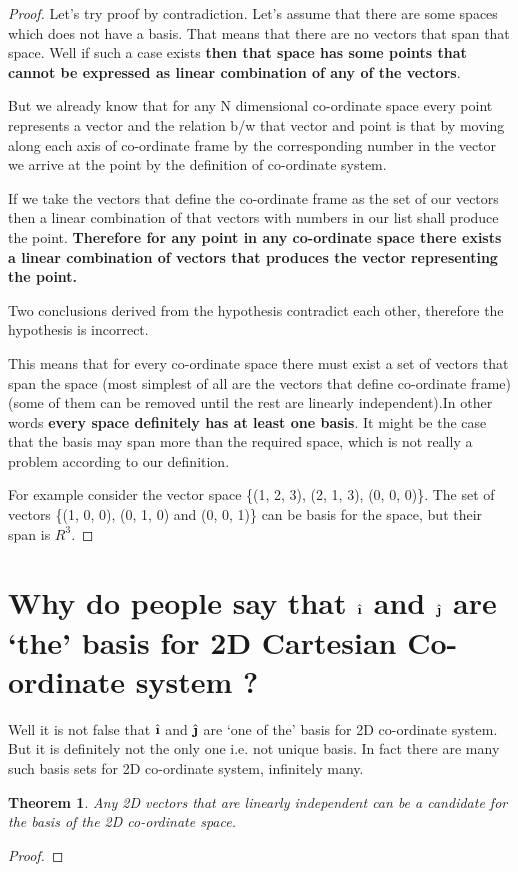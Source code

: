 \documentclass[12pt]{article}
\newtheorem{theorem}{Theorem}
\newcommand{\ihat}{\hat{\textbf{\i}}}
\newcommand{\jhat}{\hat{\textbf{\j}}}
\begin{document}
\begin{proof}
Let's try proof by contradiction.
Let's assume that there are some spaces which does not have a basis.
That means that there are no vectors that span that space.
Well if such a case exists \textbf{then that space has some points that cannot be expressed as linear combination of any of the vectors}.

But we already know that for any N dimensional co-ordinate space every point represents a vector and the relation b/w that vector and point is that by moving along each axis of co-ordinate frame by the corresponding number in the vector we arrive at the point by the definition of co-ordinate system.

If we take the vectors that define the co-ordinate frame as the set of our vectors then a linear combination of that vectors with numbers in our list shall produce the point.
\textbf{Therefore for any point in any co-ordinate space there exists a linear combination of vectors that produces the vector representing the point.}

Two conclusions derived from the hypothesis contradict each other, therefore the hypothesis is incorrect.

This means that for every co-ordinate space there must exist a set of vectors that span the space (most simplest of all are the vectors that define co-ordinate frame) (some of them can be removed until the rest are linearly independent).In other words \textbf{every space definitely has at least one basis}. It might be the case that the basis may span more than the required space, which is not really a problem according to our definition.

For example consider the vector space \{(1, 2, 3), (2, 1, 3), (0, 0, 0)\}. The set of vectors \{(1, 0, 0), (0, 1, 0) and (0, 0, 1)\} can be basis for the space, but their span is $ R^3 $.
\end{proof}

\section{Why do people say that $ \ihat $ and $ \jhat $ are `the' basis for 2D Cartesian Co-ordinate system ?}
Well it is not false that $ \ihat $ and $ \jhat $ are `one of the' basis for 2D co-ordinate system. But it is definitely not the only one i.e. not unique basis.
In fact there are many such basis sets for 2D co-ordinate system, infinitely many.

\begin{theorem}
Any 2D vectors that are linearly independent can be a candidate for the basis of the 2D co-ordinate space.
\end{theorem}

\begin{proof}
\end{proof}
\end{document}
